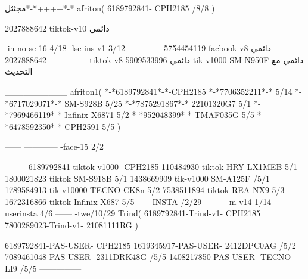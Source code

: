مجثثل*-*++++*-*
afriton(
6189792841- CPH2185  /8/8
)

2027888642 tiktok-v10
دائمي

-in-no-se-16 4/18
-lse-ins-v1 3/12
------------
5754454119 facbook-v8
دائمي
--------------
2027888642 tiktok-v8
دائمي
5909533996 tik-v1000  SM-N950F
دائمي مع التحديث

__________
afriton1(
*-*6189792841*-*-CPH2185
*-*7706352211*-* 5/14
*-*6717029071*-*  SM-S928B 5/25
*-*7875291867*-* 22101320G7 5/1
*-*7969466119*-* Infinix X6871 5/2
*-*952048399*-* TMAF035G 5/5
*-*6478592350*-* CPH2591 5/5
)


------
------------
-face-15 2/2

--------
6189792841 tiktok-v1000- CPH2185 
110484930 tiktok HRY-LX1MEB  5/1
1800021823 tiktok SM-S918B  5/1
1438669909 tik-v1000 SM-A125F /5/1
1789584913 tik-v10000  TECNO CK8n 5/2
7538511894 tiktok REA-NX9  5/3
1672316866 tiktok Infinix X687  5/5
-----
 INSTA /2/29
-------
-m-v14 1/14
-----
userinsta 4/6
------
-twe/10/29
Trind(
6189792841-Trind-v1- CPH2185 
7800289023-Trind-v1- 21081111RG \5\5
)

6189792841-PAS-USER- CPH2185 
1619345917-PAS-USER- 2412DPC0AG /5/2
7089461048-PAS-USER- 2311DRK48G /5/5
1408217850-PAS-USER- TECNO LI9 /5/5
    ---------------
